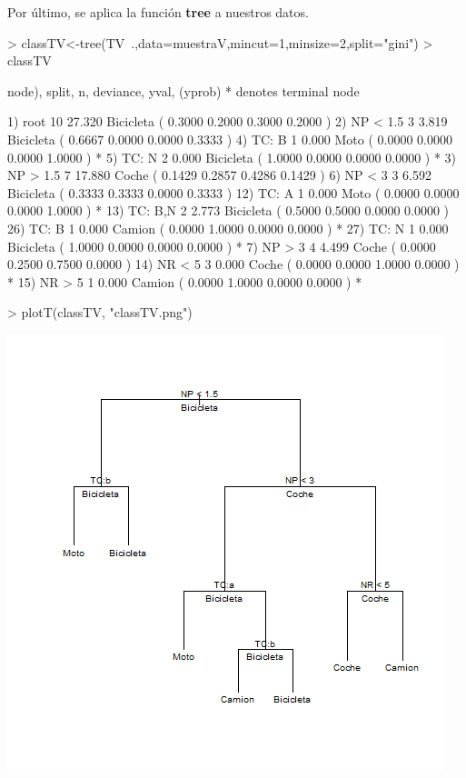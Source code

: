 \documentclass [a4paper] {article}
\begin{document}
\bigskip
Por último, se aplica la función \textbf{tree} a nuestros datos.
\begin{Schunk}
\begin{Sinput}
> classTV<-tree(TV~.,data=muestraV,mincut=1,minsize=2,split="gini")
> classTV
\end{Sinput}
\begin{Soutput}
node), split, n, deviance, yval, (yprob)
      * denotes terminal node

 1) root 10 27.320 Bicicleta ( 0.3000 0.2000 0.3000 0.2000 )  
   2) NP < 1.5 3  3.819 Bicicleta ( 0.6667 0.0000 0.0000 0.3333 )  
     4) TC: B 1  0.000 Moto ( 0.0000 0.0000 0.0000 1.0000 ) *
     5) TC: N 2  0.000 Bicicleta ( 1.0000 0.0000 0.0000 0.0000 ) *
   3) NP > 1.5 7 17.880 Coche ( 0.1429 0.2857 0.4286 0.1429 )  
     6) NP < 3 3  6.592 Bicicleta ( 0.3333 0.3333 0.0000 0.3333 )  
      12) TC: A 1  0.000 Moto ( 0.0000 0.0000 0.0000 1.0000 ) *
      13) TC: B,N 2  2.773 Bicicleta ( 0.5000 0.5000 0.0000 0.0000 )  
        26) TC: B 1  0.000 Camion ( 0.0000 1.0000 0.0000 0.0000 ) *
        27) TC: N 1  0.000 Bicicleta ( 1.0000 0.0000 0.0000 0.0000 ) *
     7) NP > 3 4  4.499 Coche ( 0.0000 0.2500 0.7500 0.0000 )  
      14) NR < 5 3  0.000 Coche ( 0.0000 0.0000 1.0000 0.0000 ) *
      15) NR > 5 1  0.000 Camion ( 0.0000 1.0000 0.0000 0.0000 ) *
\end{Soutput}
\end{Schunk}

\begin{Schunk}
\begin{Sinput}
> plotT(classTV, "classTV.png")
\end{Sinput}
\end{Schunk}
\includegraphics[width=\textwidth]{classTV}
\end{document}
